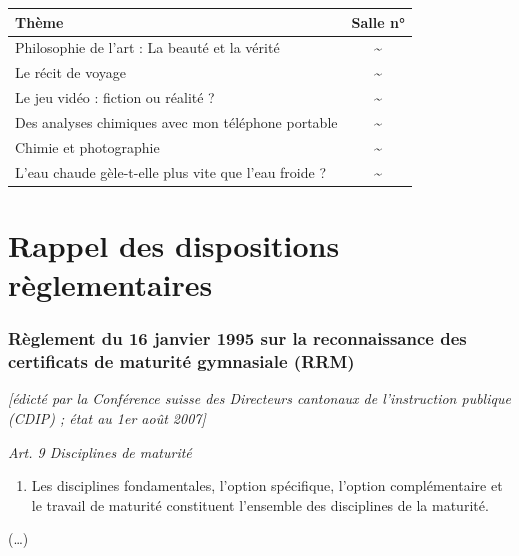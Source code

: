 \documentclass[
  10pt,
  french,
  a5paper,
  openany]{book}
\providecommand{\tightlist}{%
  \setlength{\itemsep}{0pt}\setlength{\parskip}{0pt}}
\begin{document}
\begin{longtable}[]{@{}lc@{}}
\toprule
Thème & Salle n°\tabularnewline
\midrule
\endhead
Philosophie de l'art : La beauté et la vérité & \textasciitilde{}\tabularnewline
Le récit de voyage & \textasciitilde{}\tabularnewline
Le jeu vidéo : fiction ou réalité ? & \textasciitilde{}\tabularnewline
Des analyses chimiques avec mon téléphone portable & \textasciitilde{}\tabularnewline
Chimie et photographie & \textasciitilde{}\tabularnewline
L'eau chaude gèle-t-elle plus vite que l'eau froide ? & \textasciitilde{}\tabularnewline
\bottomrule
\end{longtable}

\hypertarget{rappel-des-dispositions-ruxe8glementaires}{%
\chapter*{Rappel des dispositions règlementaires}\label{rappel-des-dispositions-ruxe8glementaires}}

\hypertarget{ruxe8glement-du-16-janvier-1995-sur-la-reconnaissance-des-certificats-de-maturituxe9-gymnasiale-rrm}{%
\subsection*{Règlement du 16 janvier 1995 sur la reconnaissance des certificats de maturité gymnasiale (RRM)}\label{ruxe8glement-du-16-janvier-1995-sur-la-reconnaissance-des-certificats-de-maturituxe9-gymnasiale-rrm}}

\emph{{[}édicté par la Conférence suisse des Directeurs cantonaux de l'instruction publique (CDIP) ; état au 1er août 2007{]}}


\emph{Art. 9 Disciplines de maturité}

\begin{enumerate}
\def\labelenumi{\arabic{enumi}.}
\tightlist
\item
  Les disciplines fondamentales, l'option spécifique, l'option complémentaire et le travail de maturité constituent l'ensemble des disciplines de la maturité.
\end{enumerate}

(\ldots)

\end{document}
